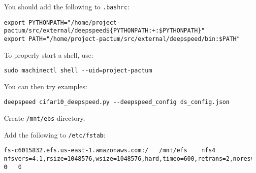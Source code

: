 You should add the following to \texttt{.bashrc}:

\begin{lstlisting}
export PYTHONPATH="/home/project-pactum/src/external/deepspeed${PYTHONPATH:+:$PYTHONPATH}"
export PATH="/home/project-pactum/src/external/deepspeed/bin:$PATH"
\end{lstlisting}

To properly start a shell, use:

\begin{lstlisting}
sudo machinectl shell --uid=project-pactum
\end{lstlisting}

You can then try examples:

\begin{lstlisting}
deepspeed cifar10_deepspeed.py --deepspeed_config ds_config.json
\end{lstlisting}

Create \lstinline|/mnt/ebs| directory.

Add the following to \lstinline|/etc/fstab|:

\begin{lstlisting}
fs-c6015832.efs.us-east-1.amazonaws.com:/   /mnt/efs    nfs4    nfsvers=4.1,rsize=1048576,wsize=1048576,hard,timeo=600,retrans=2,noresvport 0   0
\end{lstlisting}
